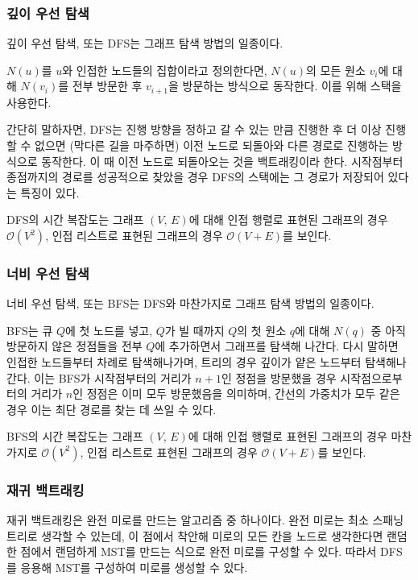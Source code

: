 \subsubsection{깊이 우선 탐색} 깊이 우선 탐색, 또는 DFS는 그래프 탐색 방법의 일종이다.

$N\left(u\right)$를 $u$와 인접한 노드들의 집합이라고 정의한다면, $N\left(u\right)$의
모든 원소 $v_i$에 대해 $N\left(v_i\right)$를 전부 방문한 후 $v_{i + 1}$을 방문하는 방식으로 동작한다.
이를 위해 스택을 사용한다.

간단히 말하자면, DFS는 진행 방향을 정하고 갈 수 있는 만큼 진행한 후 더 이상 진행할 수 없으면 (막다른 길을 마주하면)
이전 노드로 되돌아와 다른 경로로 진행하는 방식으로 동작한다. 이 때 이전 노드로 되돌아오는 것을 백트래킹이라 한다.
시작점부터 종점까지의 경로를 성공적으로 찾았을 경우 DFS의 스택에는 그 경로가 저장되어 있다는 특징이 있다.

DFS의 시간 복잡도는 그래프 $\left(V,\,E\right)$에 대해 인접 행렬로 표현된 그래프의 경우 $\mathcal{O}\left(V^2\right)$,
인접 리스트로 표현된 그래프의 경우 $\mathcal{O}\left(V+E\right)$를 보인다.

\subsubsection{너비 우선 탐색} 너비 우선 탐색, 또는 BFS는 DFS와 마찬가지로 그래프 탐색 방법의 일종이다.

BFS는 큐 $Q$에 첫 노드를 넣고, $Q$가 빌 때까지 $Q$의 첫 원소 $q$에 대해 $N\left(q\right)$ 중 아직 방문하지 않은 정점들을 전부 $Q$에 추가하면서 그래프를 탐색해 나간다.
다시 말하면 인접한 노드들부터 차례로 탐색해나가며, 트리의 경우 깊이가 얕은 노드부터 탐색해나간다. 이는 BFS가 시작점부터의 거리가 $n+1$인 정점을 방문했을 경우
시작점으로부터의 거리가 $n$인 정점은 이미 모두 방문했음을 의미하며, 간선의 가중치가 모두 같은 경우 이는 최단 경로를 찾는 데 쓰일 수 있다.

BFS의 시간 복잡도는 그래프 $\left(V,\,E\right)$에 대해 인접 행렬로 표현된 그래프의 경우 마찬가지로 $\mathcal{O}\left(V^2\right)$,
인접 리스트로 표현된 그래프의 경우 $\mathcal{O}\left(V+E\right)$를 보인다.

\subsubsection{재귀 백트래킹} 재귀 백트래킹은 완전 미로를 만드는 알고리즘 중 하나이다.
완전 미로는 최소 스패닝 트리로 생각할 수 있는데, 이 점에서 착안해 미로의 모든 칸을 노드로 생각한다면
랜덤한 점에서 랜덤하게 MST를 만드는 식으로 완전 미로를 구성할 수 있다. 따라서 DFS를 응용해 MST를 구성하여 미로를 생성할 수 있다.